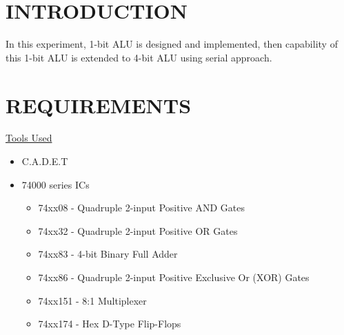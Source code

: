 \documentclass[pdftex,12pt,a4paper]{article}
\begin{document}
\setcounter{page}{1}

\section{INTRODUCTION}

In this experiment, 1-bit ALU is designed and implemented, then capability of this 1-bit ALU is extended to 4-bit ALU using serial approach.

\section{REQUIREMENTS}
\begin{flushleft}
\underline{Tools Used}\cite{booklet}
\end{flushleft}
\begin{itemize}
    \item C.A.D.E.T
    \item 74000 series ICs
    \begin{itemize}
        \item 74xx08 - Quadruple 2-input Positive AND Gates
        \item 74xx32 - Quadruple 2-input Positive OR Gates
        \item 74xx83 - 4-bit Binary Full Adder
        \item 74xx86 - Quadruple 2-input Positive Exclusive Or (XOR) Gates
        \item 74xx151 - 8:1 Multiplexer
        \item 74xx174 - Hex D-Type Flip-Flops
        
    \end{itemize}
\end{itemize}
\end{document}

